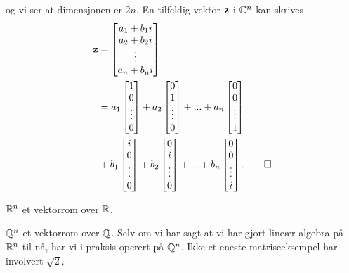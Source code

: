 \begin{ex}
og vi ser at dimensjonen er $2n$. 
En tilfeldig vektor $\mathbf{z}$ i $\mathbb{C}^n$ kan skrives
\begin{align*}
\mathbf{z}&=
\begin{bmatrix}
a_1+b_1 i    \\ a_2+b_2 i   \\ \vdots \\ a_n+b_n i 
\end{bmatrix}
\\&= 
a_1
\begin{bmatrix}
1    \\ 0  \\ \vdots \\ 0
\end{bmatrix}
+
a_2
\begin{bmatrix}
0    \\ 1  \\ \vdots \\ 0
\end{bmatrix}
+...+
a_n
\begin{bmatrix}
0    \\ 0  \\ \vdots \\ 1
\end{bmatrix}
\\ &+
b_1
\begin{bmatrix}
i    \\ 0  \\ \vdots \\ 0
\end{bmatrix}
+
b_2
\begin{bmatrix}
0    \\ i  \\ \vdots \\ 0
\end{bmatrix}
+...+
b_n
\begin{bmatrix}
0    \\ 0  \\ \vdots \\ i
\end{bmatrix}. \qedhere
\end{align*}
\end{ex}

\begin{ex}
$\mathbb{R}^n$ et vektorrom over $\mathbb{R}$.
\end{ex}

\begin{ex}
$\mathbb{Q}^n$ et vektorrom over $\mathbb{Q}$. Selv om vi har sagt at vi har gjort lineær algebra på $\mathbb{R}^n$ til nå, har vi i praksis operert på $\mathbb{Q}^n$. Ikke et eneste matriseeksempel har involvert $\sqrt{2}$.
\end{ex}

